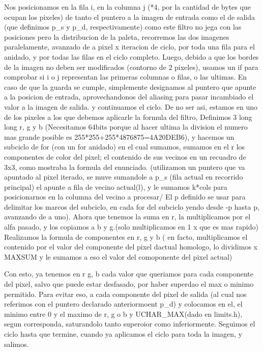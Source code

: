 \documentclass[a4paper]{article}
\begin{document}
	Nos posicionamos en la fila i, en la columna j (*4, por la cantidad de bytes que ocupan los pixeles) de tanto el puntero a la imagen de entrada como el de salida (que definimos p_s y p_d, respectivamente) como este filtro no jega con las posiciones pero la distribucion de la paleta, recorremos las dos imagenes paralelamente, avanzado de a pixel x iteracion de ciclo, por toda una fila para el anidado, y por todas las filas en el ciclo completo.
	\hfill \break	
	Luego, debido a que los bordes de la imagen no deben ser modificados (contorno de 2 pixeles), usamos un if para comprobar si i o j representan las primeras columnas o filas, o las ultimas. En caso de que la guarda se cumple, simplemente designamos al puntero que apunte a la posicion de entrada, aprovechandonos del aliasing para pasar incambiado el valor a la imagen de salida. y continuamos el ciclo.
	\hfill \break	
	De no ser asi, estamos en uno de los pixeles a los que debemos aplicarle la formula del filtro, Definimos 3 long long r, g y b (Necesitamos 64bits porque al hacer ultima la division el numero mas grande posible es 255*255+255*4876875=4A20DEB6), y hacemos un subciclo de for (con un for anidado) en el cual sumamos, sumamos en el r los componentes de color del pixel; el contenido de sus vecinos en un recuadro de 3x3, como mostraba la formula del enunciado. (utilizamon un puntero que va apuntado al pixel iterado, se muve sumandole a p_s (fila actual en recorrido principal) el apunte a fila de vecino actual(l), y le sumamos k*cols para posicionarnos en la columna del vecino a procesar/ El p definido se usar  para delimitar los marcos del subciclo, en cada for del subciclo yendo desde -p hasta p, avanzando de a uno).
	\hfill \break	
	Ahora que tenemos   la suma en r, la multiplicamos por el alfa pasado, y los copiamos a b y g.(solo multiplicamos en 1 x que es mas rapido) \hfill \break	
	Realizamos la formula de componentes en r, g y b ( en facto, multiplicamos el contenido por el valor del componente del pixel dactual homologo, lo dividimos x MAXSUM y le sumamos a eso el valor del comoponente del pixel actual)
	\hfill \break	
	
	Con esto, ya tenemos en r g, b cada  valor que queriamos para cada componente del pixel, salvo que puede estar desfasado, por haber superdao el max o minimo permitido. Para evitar eso,  a cada componente del pixel de salida (al cual nos referimos con el puntero declarado anteriormoent p_d) y colocamos en el, el minimo entre 0 y el maximo de r, g o b y UCHAR_MAX(dado en limits.h), segun corresponda, saturandolo tanto superoior como inferiormente.
	\hfill \break	
	Seguimos el ciclo hasta que termine, cuando ya aplicamos el ciclo para toda la imagen, y salimos.
	\hfill \break	
	
\end{document}
